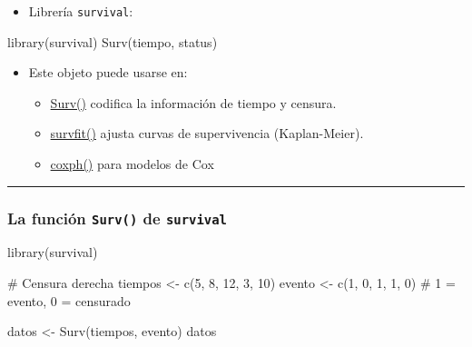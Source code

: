 \documentclass[
]{article}
\newenvironment{Shaded}{\begin{snugshade}}{\end{snugshade}}
\newcommand{\CommentTok}[1]{\textcolor[rgb]{0.37,0.37,0.37}{#1}}
\newcommand{\DecValTok}[1]{\textcolor[rgb]{0.68,0.00,0.00}{#1}}
\newcommand{\FunctionTok}[1]{\textcolor[rgb]{0.28,0.35,0.67}{#1}}
\newcommand{\NormalTok}[1]{\textcolor[rgb]{0.00,0.23,0.31}{#1}}
\newcommand{\OtherTok}[1]{\textcolor[rgb]{0.00,0.23,0.31}{#1}}
\providecommand{\tightlist}{%
  \setlength{\itemsep}{0pt}\setlength{\parskip}{0pt}}
\begin{document}
\begin{itemize}
\tightlist
\item
  Librería \texttt{survival}:
\end{itemize}

\begin{Shaded}
\begin{Highlighting}[]
\FunctionTok{library}\NormalTok{(survival)}
\FunctionTok{Surv}\NormalTok{(tiempo, status)}
\end{Highlighting}
\end{Shaded}

\begin{itemize}
\tightlist
\item
  Este objeto puede usarse en:

  \begin{itemize}
  \tightlist
  \item
    \href{https://www.rdocumentation.org/packages/survival/versions/3.5-7/topics/Surv}{Surv()}
    codifica la información de tiempo y censura.
  \item
    \href{https://www.rdocumentation.org/packages/survival/versions/3.8-3/topics/survfit.formula}{survfit()}
    ajusta curvas de supervivencia (Kaplan-Meier).
  \item
    \href{https://www.rdocumentation.org/packages/survival/versions/3.5-7/topics/coxph}{coxph()}
    para modelos de Cox
  \end{itemize}
\end{itemize}

\begin{center}\rule{0.5\linewidth}{0.5pt}\end{center}

\subsubsection{\texorpdfstring{La función \texttt{Surv()} de
\texttt{survival}}{La función Surv() de survival}}\label{la-funciuxf3n-surv-de-survival}

\begin{Shaded}
\begin{Highlighting}[]
\FunctionTok{library}\NormalTok{(survival)}

\CommentTok{\# Censura derecha}
\NormalTok{tiempos }\OtherTok{\textless{}{-}} \FunctionTok{c}\NormalTok{(}\DecValTok{5}\NormalTok{, }\DecValTok{8}\NormalTok{, }\DecValTok{12}\NormalTok{, }\DecValTok{3}\NormalTok{, }\DecValTok{10}\NormalTok{)}
\NormalTok{evento }\OtherTok{\textless{}{-}} \FunctionTok{c}\NormalTok{(}\DecValTok{1}\NormalTok{, }\DecValTok{0}\NormalTok{, }\DecValTok{1}\NormalTok{, }\DecValTok{1}\NormalTok{, }\DecValTok{0}\NormalTok{)  }\CommentTok{\# 1 = evento, 0 = censurado}

\NormalTok{datos }\OtherTok{\textless{}{-}} \FunctionTok{Surv}\NormalTok{(tiempos, evento)}
\NormalTok{datos}
\end{Highlighting}
\end{Shaded}
\end{document}
